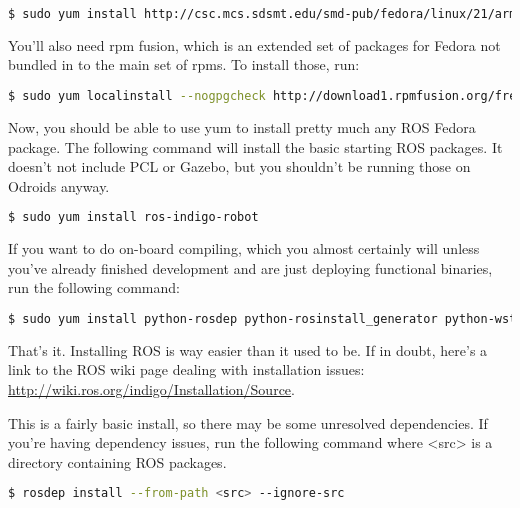 \begin{lstlisting}[language=bash,breaklines=true]
  $ sudo yum install http://csc.mcs.sdsmt.edu/smd-pub/fedora/linux/21/armhfp/smd-ros-release-21-2.noarch.rpm
\end{lstlisting}

You'll also need rpm fusion, which is an extended set of packages for Fedora not bundled in to the main set of rpms. To install those, run:

\begin{lstlisting}[language=bash,breaklines=true]
  $ sudo yum localinstall --nogpgcheck http://download1.rpmfusion.org/free/fedora/rpmfusion-free-release-$(rpm  -E %fedora).noarch.rpm http://download1.rpmfusion.org/nonfree/fedora/rpmfusion-nonfree-release-$(rpm -E %fedora).noarch.rpm	
\end{lstlisting}

Now, you should be able to use yum to install pretty much any ROS Fedora package. The following command will install the basic starting ROS packages. It doesn't not include PCL or Gazebo, but you shouldn't be running those on Odroids anyway.

\begin{lstlisting}[language=bash,breaklines=true]
  $ sudo yum install ros-indigo-robot	
\end{lstlisting}

If you want to do on-board compiling, which you almost certainly will unless you've already finished development and are just deploying functional binaries, run the following command:

\begin{lstlisting}[language=bash,breaklines=true]
  $ sudo yum install python-rosdep python-rosinstall_generator python-wstool python-rosinstall @buildsys-build	
\end{lstlisting}

That's it. Installing ROS is way easier than it used to be. If in doubt, here's a link to the ROS wiki page dealing with installation issues: \url{http://wiki.ros.org/indigo/Installation/Source}.

This is a fairly basic install, so there may be some unresolved dependencies. If you're having dependency issues, run the following command where <src> is a directory containing ROS packages.

\begin{lstlisting}[language=bash,breaklines=true]
  $ rosdep install --from-path <src> --ignore-src	
\end{lstlisting}

